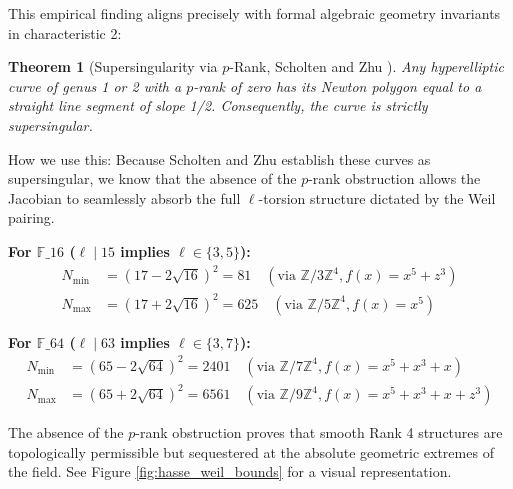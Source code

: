 \documentclass[letterpaper, 11pt]{article}
\newtheorem{theorem}{Theorem}[section]
\begin{document}
This empirical finding aligns precisely with formal algebraic geometry invariants in characteristic 2:
\begin{theorem}[Supersingularity via $p$-Rank, Scholten and Zhu \cite{Scholten2002}]
Any hyperelliptic curve of genus 1 or 2 with a $p$-rank of zero has its Newton polygon equal to a straight line segment of slope 1/2. Consequently, the curve is strictly supersingular.
\end{theorem}

How we use this: Because Scholten and Zhu establish these curves as supersingular, we know that the absence of the $p$-rank obstruction allows the Jacobian to seamlessly absorb the full $\ell$-torsion structure dictated by the Weil pairing. 

\textbf{For $\mathbb{F}\_{16}$ ($\ell \mid 15$ implies $\ell \in \{3, 5\}$):}
\begin{align*}
    N_{\text{min}} &= (17 - 2\sqrt{16})^2 = 81 \quad (\text{via } \mathbb{Z}/3\mathbb{Z}^4, f(x) = x^5 + z^3) \\
    N_{\text{max}} &= (17 + 2\sqrt{16})^2 = 625 \quad (\text{via } \mathbb{Z}/5\mathbb{Z}^4, f(x) = x^5)
\end{align*}

\textbf{For $\mathbb{F}\_{64}$ ($\ell \mid 63$ implies $\ell \in \{3, 7\}$):}
\begin{align*}
    N_{\text{min}} &= (65 - 2\sqrt{64})^2 = 2401 \quad (\text{via } \mathbb{Z}/7\mathbb{Z}^4, f(x) = x^5 + x^3 + x) \\
    N_{\text{max}} &= (65 + 2\sqrt{64})^2 = 6561 \quad (\text{via } \mathbb{Z}/9\mathbb{Z}^4, f(x) = x^5 + x^3 + x + z^3)
\end{align*}

The absence of the $p$-rank obstruction proves that smooth Rank 4 structures are topologically permissible but sequestered at the absolute geometric extremes of the field. See Figure \ref{fig:hasse_weil_bounds} for a visual representation.
\end{document}
